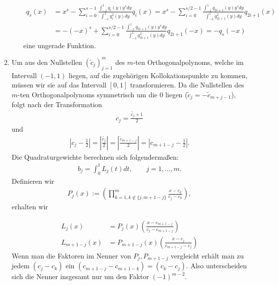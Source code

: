 \begin{solution}
\begin{enumerate}[label = \textbf{\alph*)}]
\begin{itemize}
  \begin{align*}
    q_s(x) &= x^s - \sum_{i = 0}^{s-1}\frac{\int_{-1}^1 q_i(y) y^s dy}{\int_{-1}^1 q_i^2(y) dy}q_i(x)
    = x^s - \sum_{i = 0}^{s/2-1}\frac{\int_{-1}^1q_{2i+1}(y)y^s dy}{\int_{-1}^1q_{2i+1}^2(y)dy}q_{2i+1}(x)\\
    &= -(-x)^s +
    \sum_{i = 0}^{s/2-1}\frac{\int_{-1}^1q_{2i+1}(y)y^s dy}{\int_{-1}^1q_{2i+1}^2(y)dy}q_{2i+1}(-x)
    = -q_s(-x)
  \end{align*}
  eine ungerade Funktion.
\end{itemize}
\item Um aus den Nullstellen $(\widetilde{c}_j)_{j = 1}^m$ des $m$-ten Orthogonalpolynoms,
welche im Intervall $(-1,1)$ liegen, auf die zugehörigen Kollokationspunkte zu kommen,
müssen wir sie auf das Intervall $[0,1]$ transformieren.
Da die Nullstellen des $m$-ten Orthogonalpolynoms symmetrisch um die $0$ liegen
($\widetilde{c}_j = -\widetilde{c}_{m+j-1}$), folgt nach der Transformation
\begin{align*}
  c_j = \frac{\widetilde{c_j} + 1}{2}
\end{align*}
und
\begin{align*}
  \left|c_j - \frac{1}{2}\right| = \left|\frac{\widetilde{c_j}}{2}\right| =
  \left|\frac{\widetilde{c}_{m+1-j}}{2}\right| = \left|c_{m+1-j} - \frac{1}{2}\right|.
\end{align*}
Die Quadraturgewichte berechnen sich folgendermaßen:
\begin{align*}
  b_j = \int_{0}^1 L_j(t) dt, \qquad j = 1,\dots,m.
\end{align*}
Definieren wir
\begin{align*}
  P_j(x) := \left(\prod_{k = 1, k \notin \{j,m+1-j\}}^m\frac{x - c_k}{c_j - c_k}\right),
\end{align*}
erhalten wir

\begin{align*}
  L_j(x) &= P_j(x)\left(\frac{x - c_{m+1-j}}{c_j - c_{m+1-j}}\right)\\
  L_{m+1-j}(x) &= P_{m+1-j}(x)\left(\frac{x - c_{j}}{c_{m+1-j} - c_j}\right)
\end{align*}
Wenn man die Faktoren im Nenner von $P_j, P_{m+1-j}$ vergleicht erhält man zu jedem $(c_j - c_k)$
ein $(c_{m+1-j}- c_{m+1-k}) = (c_k - c_j)$. Also unterscheiden sich die Nenner
insgesamt nur um den Faktor $(-1)^{m-2}$.
\end{enumerate}
\end{solution}
